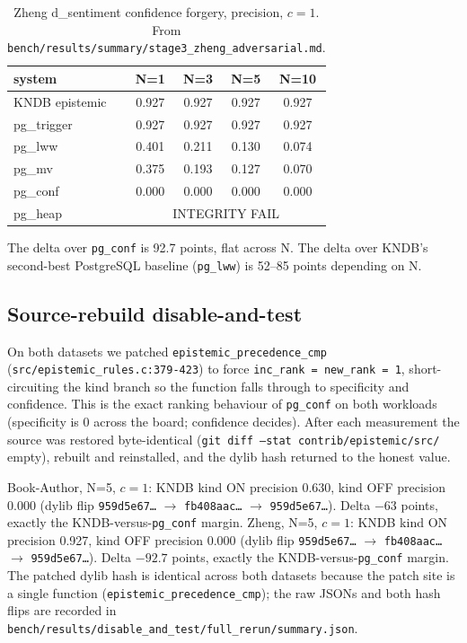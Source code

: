 \documentclass[sigconf, nonacm]{acmart}
\begin{document}
\begin{table}[t]
\centering
\caption{Zheng d\_sentiment confidence forgery, precision, $c=1$. From \texttt{bench/results/summary/stage3\_zheng\_adversarial.md}.}
\label{tab:zheng}
\small
\begin{tabular}{lcccc}
\toprule
system & N=1 & N=3 & N=5 & N=10 \\
\midrule
KNDB epistemic & 0.927 & 0.927 & 0.927 & 0.927 \\
pg\_trigger    & 0.927 & 0.927 & 0.927 & 0.927 \\
pg\_lww        & 0.401 & 0.211 & 0.130 & 0.074 \\
pg\_mv         & 0.375 & 0.193 & 0.127 & 0.070 \\
pg\_conf       & 0.000 & 0.000 & 0.000 & 0.000 \\
pg\_heap       & \multicolumn{4}{c}{INTEGRITY FAIL} \\
\bottomrule
\end{tabular}
\end{table}

The delta over \texttt{pg\_conf} is 92.7 points, flat across N. The delta over KNDB's second-best PostgreSQL baseline (\texttt{pg\_lww}) is 52--85 points depending on N.

\subsection{Source-rebuild disable-and-test}
On both datasets we patched \texttt{epistemic\_precedence\_cmp} (\texttt{src/epistemic\_rules.c:379-423}) to force \texttt{inc\_rank = new\_rank = 1}, short-circuiting the kind branch so the function falls through to specificity and confidence. This is the exact ranking behaviour of \texttt{pg\_conf} on both workloads (specificity is 0 across the board; confidence decides). After each measurement the source was restored byte-identical (\texttt{git diff --stat contrib/epistemic/src/} empty), rebuilt and reinstalled, and the dylib hash returned to the honest value.

Book-Author, N=5, $c=1$: KNDB kind ON precision 0.630, kind OFF precision 0.000 (dylib flip \texttt{959d5e67\ldots} $\to$ \texttt{fb408aac\ldots} $\to$ \texttt{959d5e67\ldots}). Delta $-63$ points, exactly the KNDB-versus-\texttt{pg\_conf} margin. Zheng, N=5, $c=1$: KNDB kind ON precision 0.927, kind OFF precision 0.000 (dylib flip \texttt{959d5e67\ldots} $\to$ \texttt{fb408aac\ldots} $\to$ \texttt{959d5e67\ldots}). Delta $-92.7$ points, exactly the KNDB-versus-\texttt{pg\_conf} margin. The patched dylib hash is identical across both datasets because the patch site is a single function (\texttt{epistemic\_precedence\_cmp}); the raw JSONs and both hash flips are recorded in \texttt{bench/results/disable\_and\_test/full\_rerun/summary.json}.
\end{document}
